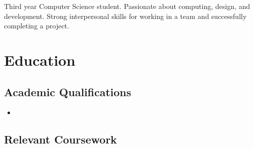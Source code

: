 \documentclass[11pt,a4paper,roman]{moderncv}        %
\begin{document}
\makecvtitle

\vspace{0pt}

\small{Third year Computer Science student.  Passionate about computing, design, and development. Strong interpersonal skills for working in a team and successfully completing a project.}

\section{Education}

\vspace{0pt}

\subsection{Academic Qualifications}

\vspace{0pt}

\begin{itemize}

\item{}

\end{itemize}

\vspace{2pt}

\subsection{Relevant Coursework}

\vspace{1pt}
\end{document}
